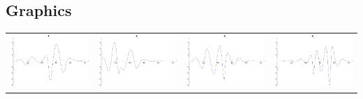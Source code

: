 \documentclass{article}
\begin{document}
\begin{landscape}
\subsection{Graphics}
\begin{tabular}{cccc}
\includegraphics[width=5.0cm]{sextic_wavelet_1.pdf}& \includegraphics[width=5.0cm]{sextic_wavelet_2.pdf}& \includegraphics[width=5.0cm]{sextic_wavelet_3.pdf}& \includegraphics[width=5.0cm]{sextic_wavelet_4.pdf} \\

\end{tabular}
\end{landscape}
\end{document}
